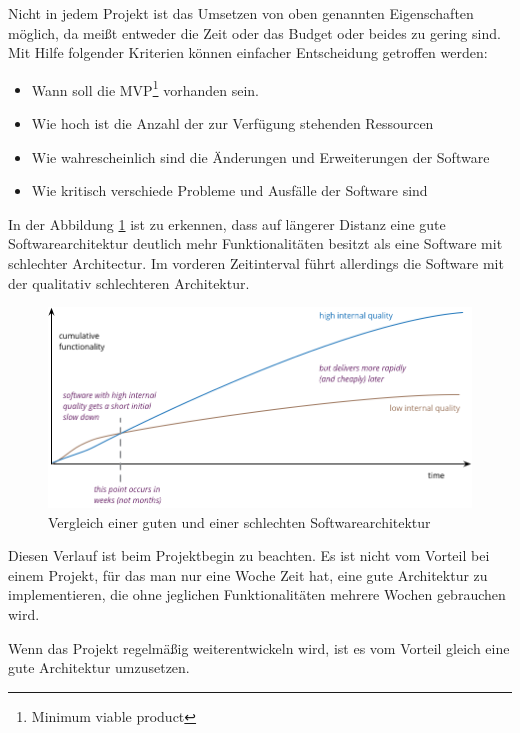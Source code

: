     Nicht in jedem Projekt ist das Umsetzen von oben genannten Eigenschaften möglich, 
    da meißt entweder die Zeit oder das Budget oder beides zu gering sind.
    Mit Hilfe folgender Kriterien können einfacher Entscheidung getroffen werden:
    \begin{itemize}
        \item Wann soll die MVP\footnote[1]{Minimum viable product} vorhanden sein.
        \item Wie hoch ist die Anzahl der zur Verfügung stehenden Ressourcen
        \item Wie wahrescheinlich sind die Änderungen und Erweiterungen der Software
        \item Wie kritisch verschiede Probleme und Ausfälle der Software sind 
    \end{itemize}

    In der Abbildung \ref{fig:softQuality} ist zu erkennen, dass auf längerer Distanz eine gute Softwarearchitektur deutlich mehr Funktionalitäten 
    besitzt als eine Software mit schlechter Architectur. Im vorderen Zeitinterval führt allerdings die Software mit der qualitativ schlechteren Architektur.
    \begin{figure}[H]
        \centering
        \includegraphics[width=1\textwidth]{./images/QASoftwareCompare.png}
        \caption[Vergleich einer guten und einer schlechten Softwarearchitektur]{Vergleich einer guten und einer schlechten Softwarearchitektur \footnotemark}
        \label{fig:softQuality}
    \end{figure}
    Diesen Verlauf ist beim Projektbegin zu beachten. Es ist nicht vom Vorteil bei einem Projekt, 
    für das man nur eine Woche Zeit hat, eine gute Architektur zu implementieren, die ohne jeglichen Funktionalitäten mehrere Wochen gebrauchen wird.

    Wenn das Projekt regelmäßig weiterentwickeln wird, ist es vom Vorteil gleich eine gute Architektur umzusetzen.
